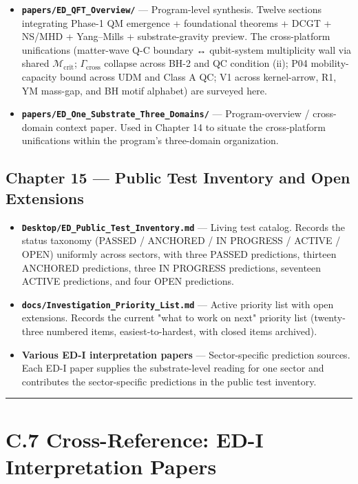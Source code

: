 \documentclass[11pt]{book}
\begin{document}
\begin{itemize}
\item \textbf{\texttt{papers/ED\_QFT\_Overview/}} — Program-level synthesis. Twelve sections integrating Phase-1 QM emergence + foundational theorems + DCGT + NS/MHD + Yang–Mills + substrate-gravity preview. The cross-platform unifications (matter-wave Q-C boundary ↔ qubit-system multiplicity wall via shared $\mathcal{M}_\mathrm{crit}$; $\Gamma_\mathrm{cross}$ collapse across BH-2 and QC condition (ii); P04 mobility-capacity bound across UDM and Class A QC; V1 across kernel-arrow, R1, YM mass-gap, and BH motif alphabet) are surveyed here.
\item \textbf{\texttt{papers/ED\_One\_Substrate\_Three\_Domains/}} — Program-overview / cross-domain context paper. Used in Chapter 14 to situate the cross-platform unifications within the program's three-domain organization.
\end{itemize}

\subsection{Chapter 15 — Public Test Inventory and Open Extensions}

\begin{itemize}
\item \textbf{\texttt{Desktop/ED\_Public\_Test\_Inventory.md}} — Living test catalog. Records the status taxonomy (PASSED / ANCHORED / IN PROGRESS / ACTIVE / OPEN) uniformly across sectors, with three PASSED predictions, thirteen ANCHORED predictions, three IN PROGRESS predictions, seventeen ACTIVE predictions, and four OPEN predictions.
\item \textbf{\texttt{docs/Investigation\_Priority\_List.md}} — Active priority list with open extensions. Records the current "what to work on next" priority list (twenty-three numbered items, easiest-to-hardest, with closed items archived).
\item \textbf{Various ED-I interpretation papers} — Sector-specific prediction sources. Each ED-I paper supplies the substrate-level reading for one sector and contributes the sector-specific predictions in the public test inventory.
\end{itemize}

\bigskip\hrule\bigskip

\section{C.7 Cross-Reference: ED-I Interpretation Papers}
\end{document}
